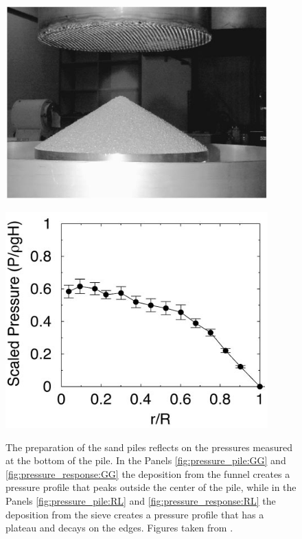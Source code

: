 \begin{figure}[H]
\begin{minipage}{.45\linewidth}
        \includegraphics[width=0.9\textwidth]{04-figuras/Sand_Pile_RL_Experiment.png}
        \label{fig:pressure_pile:RL}
    \end{minipage}
    \begin{minipage}{.45\linewidth}
        \centering
        \includegraphics[width=0.9\textwidth]{04-figuras/Sand_Pile_RL_Pressure.png}
        \label{fig:pressure_response:RL}
    \end{minipage}
    \caption[Effect of the preparation history using funnel and sieve.]{The preparation of the sand piles reflects on the pressures measured at the bottom of the pile. In the Panels \ref{fig:pressure_pile:GG} and \ref{fig:pressure_response:GG} the deposition from the funnel creates a pressure profile that peaks outside the center of the pile, while in the Panels \ref{fig:pressure_pile:RL} and \ref{fig:pressure_response:RL} the deposition from the sieve creates a pressure profile that has a plateau and decays on the edges. Figures taken from \cite{Memories_in_Sand}.}
    \label{fig:pile_stress}
\end{figure}    

